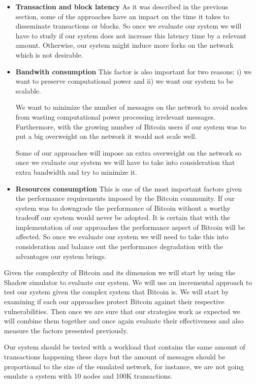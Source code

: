 \begin{itemize}
\item \textbf{Transaction and block latency} As it was described in the previous section, some of the approaches have an impact on the time it takes to disseminate transactions or blocks. So once we evaluate our system we will have to study if our system does not increase this latency time by a relevant amount. Otherwise, our system might induce more forks on the network which is not desirable.

\item \textbf{Bandwith consumption} This factor is also important for two reasons: i) we want to preserve computational power and ii) we want our system to be scalable.

We want to minimize the number of messages on the network to avoid nodes from wasting computational power processing irrelevant messages. Furthermore, with the growing number of Bitcoin users if our system was to put a big overweight on the network it would not scale well.

Some of our approaches will impose an extra overweight on the network so once we evaluate our system we will have to take into consideration that extra bandwidth and try to minimize it.

\item \textbf{Resources consumption} This is one of the most important factors given the performance requirements imposed by the Bitcoin community. If our system was to downgrade the performance of Bitcoin without a worthy tradeoff our system would never be adopted. It is certain that with the implementation of our approaches the performance aspect of Bitcoin will be affected. So once we evaluate our system we will need to take this into consideration and balance out the performance degradation with the advantages our system brings.
\end{itemize}

Given the complexity of Bitcoin and its dimension we will start by using the Shadow simulator \cite{jansen2011shadow} to evaluate our system. We will use an incremental approach to test our system given the complex system that Bitcoin is. We will start by examining if each our approaches protect Bitcoin against their respective vulnerabilities. Then once we are sure that our strategies work as expected we will combine them together and once again evaluate their effectiveness and also measure the factors presented previously.

Our system should be tested with a workload that contains the same amount of transactions happening these days but the amount of messages should be proportional to the size of the emulated network, for instance, we are not going emulate a system with 10 nodes and 100K transactions.

